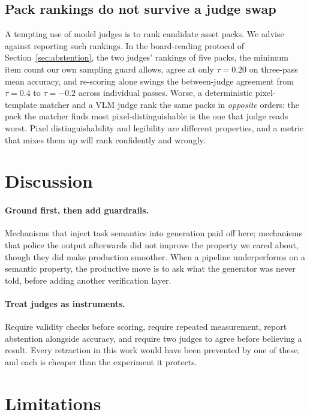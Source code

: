 \documentclass{article}
\begin{document}
\subsection{Pack rankings do not survive a judge swap}

A tempting use of model judges is to rank candidate asset packs. We advise against reporting such
rankings. In the board-reading protocol of Section~\ref{sec:abstention}, the two judges' rankings
of five
packs, the minimum item count our own sampling guard allows, agree at only $\tau = 0.20$ on
three-pass mean accuracy, and re-scoring alone swings the between-judge agreement from
$\tau = 0.4$ to $\tau = -0.2$ across individual passes. Worse, a deterministic pixel-template
matcher and a
VLM judge rank the same packs in \emph{opposite} orders: the pack the matcher finds most
pixel-distinguishable is the one that judge reads worst. Pixel distinguishability and
legibility are different properties, and a metric that mixes them up will rank confidently and
wrongly.

\section{Discussion}

\paragraph{Ground first, then add guardrails.}
Mechanisms that inject task semantics into generation paid off here; mechanisms that police the
output afterwards did not improve the property we cared about, though they did make production
smoother. When a pipeline underperforms on a semantic property, the productive move is to
ask what the generator was never told, before adding another verification layer.

\paragraph{Treat judges as instruments.} Require validity checks before scoring, require repeated
measurement, report abstention alongside accuracy, and require two judges to agree before believing
a result. Every retraction in this work would have been prevented by one of these, and each is
cheaper than the experiment it protects.

\section{Limitations}
\end{document}

